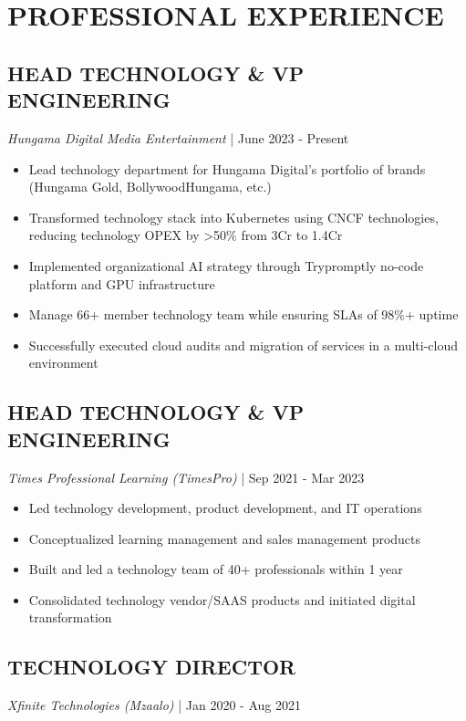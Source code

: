 \documentclass[a4paper,11pt]{article}
\newcommand{\workperiod}[2]{{\small \textit{#1} | #2}}
\begin{document}
\section{PROFESSIONAL EXPERIENCE}

\subsection{HEAD TECHNOLOGY \& VP ENGINEERING}
\workperiod{Hungama Digital Media Entertainment}{June 2023 - Present}

\begin{itemize}[leftmargin=*]
    \item Lead technology department for Hungama Digital's portfolio of brands (Hungama Gold, BollywoodHungama, etc.)
    \item Transformed technology stack into Kubernetes using CNCF technologies, reducing technology OPEX by >50\% from 3Cr to 1.4Cr
    \item Implemented organizational AI strategy through Trypromptly no-code platform and GPU infrastructure
    \item Manage 66+ member technology team while ensuring SLAs of 98\%+ uptime
    \item Successfully executed cloud audits and migration of services in a multi-cloud environment
\end{itemize}

\subsection{HEAD TECHNOLOGY \& VP ENGINEERING}
\workperiod{Times Professional Learning (TimesPro)}{Sep 2021 - Mar 2023}

\begin{itemize}[leftmargin=*]
    \item Led technology development, product development, and IT operations
    \item Conceptualized learning management and sales management products
    \item Built and led a technology team of 40+ professionals within 1 year
    \item Consolidated technology vendor/SAAS products and initiated digital transformation
\end{itemize}

\subsection{TECHNOLOGY DIRECTOR}
\workperiod{Xfinite Technologies (Mzaalo)}{Jan 2020 - Aug 2021}
\end{document}
